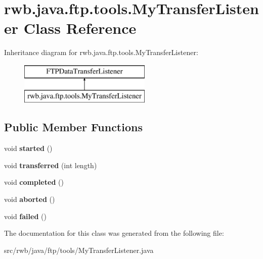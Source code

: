 \hypertarget{classrwb_1_1java_1_1ftp_1_1tools_1_1_my_transfer_listener}{}\section{rwb.\+java.\+ftp.\+tools.\+My\+Transfer\+Listener Class Reference}
\label{classrwb_1_1java_1_1ftp_1_1tools_1_1_my_transfer_listener}
Inheritance diagram for rwb.\+java.\+ftp.\+tools.\+My\+Transfer\+Listener\+:\begin{figure}[H]
\begin{center}
\leavevmode
\includegraphics[height=2.000000cm]{classrwb_1_1java_1_1ftp_1_1tools_1_1_my_transfer_listener}
\end{center}
\end{figure}
\subsection*{Public Member Functions}
\begin{DoxyCompactItemize}
\item 
\mbox{\label{classrwb_1_1java_1_1ftp_1_1tools_1_1_my_transfer_listener_a93d85c59e16df1beedbcaac13138728c}} 
void {\bfseries started} ()
\item 
\mbox{\label{classrwb_1_1java_1_1ftp_1_1tools_1_1_my_transfer_listener_ab3fe95564d15cf09c71539afc8682785}} 
void {\bfseries transferred} (int length)
\item 
\mbox{\label{classrwb_1_1java_1_1ftp_1_1tools_1_1_my_transfer_listener_ae954366740504d8c64c4f3219b0b0f0d}} 
void {\bfseries completed} ()
\item 
\mbox{\label{classrwb_1_1java_1_1ftp_1_1tools_1_1_my_transfer_listener_aa12a4f8d84ec61eb27e7aea602f015a8}} 
void {\bfseries aborted} ()
\item 
\mbox{\label{classrwb_1_1java_1_1ftp_1_1tools_1_1_my_transfer_listener_ad8e071c62f007e3a6486902186212aea}} 
void {\bfseries failed} ()
\end{DoxyCompactItemize}


The documentation for this class was generated from the following file\+:\begin{DoxyCompactItemize}
\item 
src/rwb/java/ftp/tools/My\+Transfer\+Listener.\+java\end{DoxyCompactItemize}
